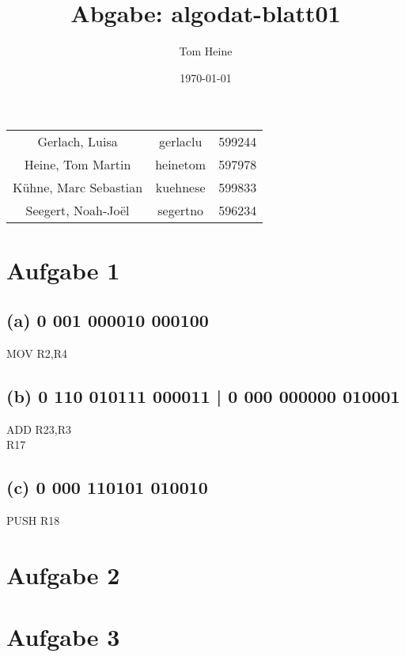 \documentclass[12pt,a4paper]{scrartcl}
\author{Tom Heine}
\title{Abgabe: algodat-blatt01}
\date{\today}
\begin{document}
	\newpage
	\begin{center}
		\begin{tabular}{ccc}
			Gerlach, Luisa&gerlaclu&599244\\
			Heine, Tom Martin&heinetom&597978\\
			Kühne, Marc Sebastian&kuehnese&599833\\
			Seegert, Noah-Joël&segertno&596234
		\end{tabular}
	\end{center}
	\section*{Aufgabe 1}
	\subsection*{(a) 0 001 000010 000100}
		MOV R2,R4
	\subsection*{(b) 0 110 010111 000011 |
					 0 000 000000 010001}
		ADD R23,R3\\
		R17
	\subsection*{(c) 0 000 110101 010010}
		PUSH R18
	\newpage
	\section*{Aufgabe 2}
	\newpage
	\section*{Aufgabe 3}
\end{document}
